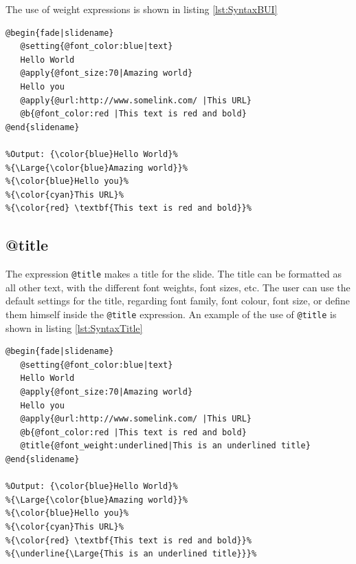 {
The use of weight expressions is shown in listing \ref{lst:SyntaxBUI}
\begin{lstlisting}[frame=single, caption=Hello World with font weight, label=lst:SyntaxBUI]
@begin{fade|slidename}
   @setting{@font_color:blue|text}
   Hello World
   @apply{@font_size:70|Amazing world}
   Hello you
   @apply{@url:http://www.somelink.com/ |This URL}
   @b{@font_color:red |This text is red and bold}
@end{slidename}

%Output: {\color{blue}Hello World}%
%{\Large{\color{blue}Amazing world}}%
%{\color{blue}Hello you}%
%{\color{cyan}This URL}%
%{\color{red} \textbf{This text is red and bold}}%
\end{lstlisting}

\subsection{@title}
The expression \lstinline!@title! makes a title for the slide. The title can be formatted as all other text, with the different font weights, font sizes, etc. The user can use the default settings for the title, regarding font family, font colour, font size, or define them himself inside the \lstinline!@title! expression.
An example of the use of \lstinline!@title! is shown in listing \ref{lst:SyntaxTitle}
\newpage
\begin{lstlisting}[frame=single, caption=Hello World with title, label=lst:SyntaxTitle]
@begin{fade|slidename}
   @setting{@font_color:blue|text}
   Hello World
   @apply{@font_size:70|Amazing world}
   Hello you
   @apply{@url:http://www.somelink.com/ |This URL}
   @b{@font_color:red |This text is red and bold}
   @title{@font_weight:underlined|This is an underlined title}
@end{slidename}

%Output: {\color{blue}Hello World}%
%{\Large{\color{blue}Amazing world}}%
%{\color{blue}Hello you}%
%{\color{cyan}This URL}%
%{\color{red} \textbf{This text is red and bold}}%
%{\underline{\Large{This is an underlined title}}}%
\end{lstlisting}
}
